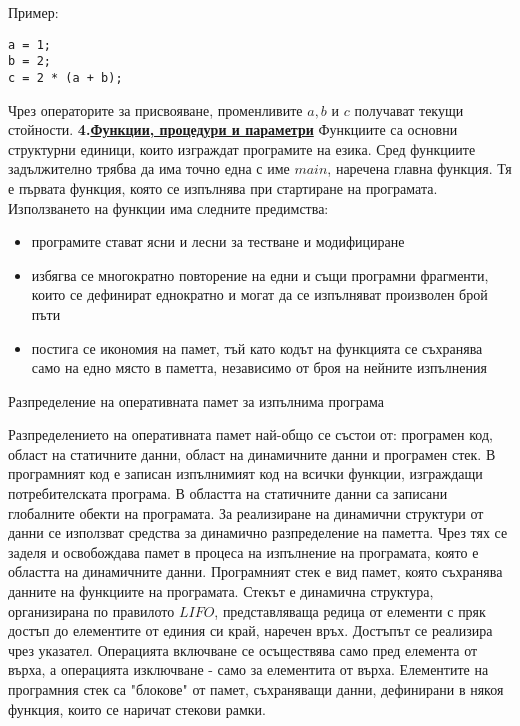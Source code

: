 \documentclass{article}
\begin{document}
Пример:
\begin{lstlisting}
a = 1;
b = 2;
c = 2 * (a + b);
\end{lstlisting}
Чрез операторите за присвояване, променливите $a, b$ и $c$ получават текущи стойности. \newline\newline
\textbf{4.\underline{Функции, процедури и параметри}} \newline
Функциите са основни структурни единици, които изграждат програмите на езика. Сред функциите задължително трябва да има точно една
с име $main$, наречена главна функция. Тя е първата функция, която се изпълнява при стартиране на програмата. Използването на
функции има следните предимства:
\begin{itemize}
    \item програмите стават ясни и лесни за тестване и модифициране
    \item избягва се многократно повторение на едни и същи програмни фрагменти, които се дефинират еднократно и могат да се
    изпълняват произволен брой пъти
    \item постига се икономия на памет, тъй като кодът на функцията се съхранява само на едно място в паметта, независимо от броя
    на нейните изпълнения
\end{itemize}

Разпределение на оперативната памет за изпълнима програма \newline

Разпределението на оперативната памет най-общо се състои от: програмен код, област на статичните данни, област на динамичните
данни и програмен стек. В програмният код е записан изпълнимият код на всички функции, изграждащи потребителската програма. В
областта на статичните данни са записани глобалните обекти на програмата. За реализиране на динамични структури от данни се
използват средства за динамично разпределение на паметта. Чрез тях се заделя и освобождава памет в процеса на изпълнение на 
програмата, която е областта на динамичните данни. Програмният стек е вид памет, която съхранява данните на функциите на програмата.
Стекът е динамична структура, организирана по правилото $LIFO$, представляваща редица от елементи с пряк достъп до елементите от
единия си край, наречен връх. Достъпът се реализира чрез указател. Операцията включване се осъществява само пред елемента от върха,
а операцията изключване - само за елементита от върха. Елементите на програмния стек са "блокове" от памет, съхраняващи данни,
дефинирани в някоя функция, които се наричат стекови рамки.
\end{document}
